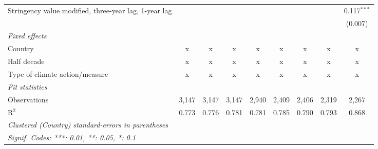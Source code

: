 \begin{table}[htbp]
\begin{tabular}{lcccccccc}
      Stringency value modified, three-year lag, 1-year lag                                 &         &              &              &               &               &               &               & 0.117$^{***}$\\   
                                                                                            &         &              &              &               &               &               &               & (0.007)\\   
      \emph{Fixed effects}\\
      Country                                                                               & x       & x            & x            & x             & x             & x             & x             & x\\  
      Half decade                                                                           & x       & x            & x            & x             & x             & x             & x             & x\\  
      Type of climate action/measure                                                        & x       & x            & x            & x             & x             & x             & x             & x\\  
      \midrule \emph{Fit statistics}\\
      Observations                                                                          & 3,147   & 3,147        & 3,147        & 2,940         & 2,409         & 2,406         & 2,319         & 2,267\\  
      R$^2$                                                                                 & 0.773   & 0.776        & 0.781        & 0.781         & 0.785         & 0.790         & 0.793         & 0.868\\  
      \midrule
      \multicolumn{9}{l}{\emph{Clustered (Country) standard-errors in parentheses}}\\
      \multicolumn{9}{l}{\emph{Signif. Codes: ***: 0.01, **: 0.05, *: 0.1}}\\
   \end{tabular}
\end{table}


